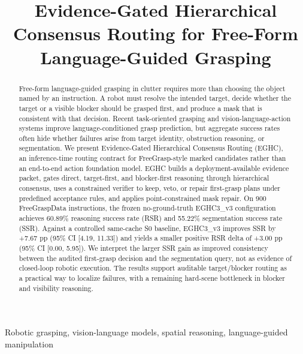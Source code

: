 \documentclass[journal]{IEEEtran}
\begin{document}
\title{Evidence-Gated Hierarchical Consensus Routing for Free-Form Language-Guided Grasping}

\author{
}

\maketitle

\begin{abstract}
Free-form language-guided grasping in clutter requires more than choosing the object named by an instruction. A robot must resolve the intended target, decide whether the target or a visible blocker should be grasped first, and produce a mask that is consistent with that decision. Recent task-oriented grasping and vision-language-action systems improve language-conditioned grasp prediction, but aggregate success rates often hide whether failures arise from target identity, obstruction reasoning, or segmentation. We present Evidence-Gated Hierarchical Consensus Routing (EGHC), an inference-time routing contract for FreeGrasp-style marked candidates rather than an end-to-end action foundation model. EGHC builds a deployment-available evidence packet, gates direct, target-first, and blocker-first reasoning through hierarchical consensus, uses a constrained verifier to keep, veto, or repair first-grasp plans under predefined acceptance rules, and applies point-constrained mask repair. On 900 FreeGraspData instructions, the frozen no-ground-truth EGHC3\_v3 configuration achieves 60.89\% reasoning success rate (RSR) and 55.22\% segmentation success rate (SSR). Against a controlled same-cache S0 baseline, EGHC3\_v3 improves SSR by +7.67 pp (95\% CI [4.19, 11.33]) and yields a smaller positive RSR delta of +3.00 pp (95\% CI [0.00, 5.95]). We interpret the larger SSR gain as improved consistency between the audited first-grasp decision and the segmentation query, not as evidence of closed-loop robotic execution. The results support auditable target/blocker routing as a practical way to localize failures, with a remaining hard-scene bottleneck in blocker and visibility reasoning.
\end{abstract}

\begin{IEEEkeywords}
Robotic grasping, vision-language models, spatial reasoning, language-guided manipulation
\end{IEEEkeywords}






\end{document}

